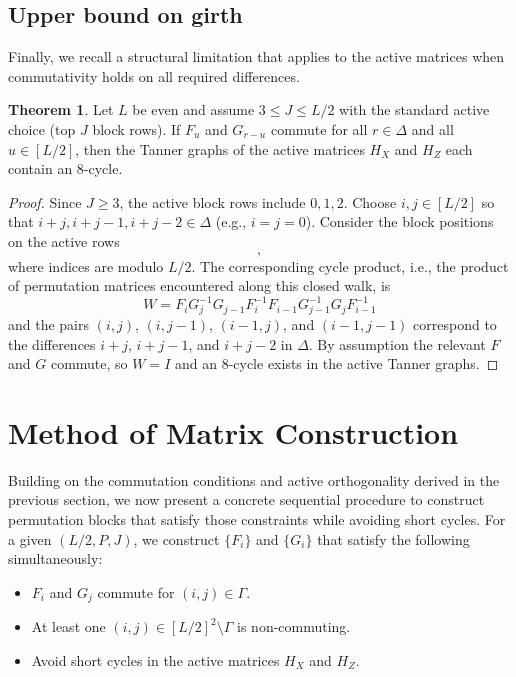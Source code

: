\documentclass[a4paper,onecolumn,11pt,accepted=2026-08-03]{quantumarticle}
\renewcommand\[{\begin{equation}}
\renewcommand\]{\end{equation}}
\theoremstyle{definition}
\newtheorem{theorem}{Theorem}[section]
\begin{document}
\subsection{Upper bound on girth}
Finally, we recall a structural limitation that applies to the active matrices when commutativity holds on all required differences.
\begin{theorem}
Let $L$ be even and assume $3\le J\le L/2$ with the standard active choice (top $J$ block rows). If $F_u$ and $G_{r-u}$ commute for all $r\in\Delta$ and all $u\in[L/2]$, then the Tanner graphs of the active matrices $H_X$ and $H_Z$ each contain an 8-cycle.
\end{theorem}
\begin{proof}
Since $J\ge 3$, the active block rows include $0,1,2$. Choose $i,j\in[L/2]$ so that $i+j,i+j-1,i+j-2\in\Delta$ (e.g., $i=j=0$). Consider the block positions on the active rows
\[
[(0,i),(0,L/2+j),(1,L/2+j),(1,i+1),(2,i+1),(2,L/2+j+1),(1,L/2+j+1),(1,i)],
\]
where indices are modulo $L/2$. The corresponding cycle product, i.e., the product of permutation matrices encountered along this closed walk, is
\[
W=F_iG_j^{-1}G_{j-1}F_i^{-1}F_{i-1}G_{j-1}^{-1}G_jF_{i-1}^{-1}
\label{eq:8cycle-word-general}
\]
and the pairs $(i,j)$, $(i,j-1)$, $(i-1,j)$, and $(i-1,j-1)$ correspond to the differences $i+j$, $i+j-1$, and $i+j-2$ in $\Delta$. By assumption the relevant $F$ and $G$ commute, so $W=I$ and an 8-cycle exists in the active Tanner graphs.
\end{proof}

\section{Method of Matrix Construction}
\label{sec:sequential-apm}
Building on the commutation conditions and active orthogonality derived in the previous section, we now present a concrete sequential procedure to construct permutation blocks that satisfy those constraints while avoiding short cycles.
For a given $(L/2,P,J)$, we construct $\{F_i\}$ and $\{G_i\}$ that satisfy the following simultaneously:
\begin{itemize}
\item[(1)] $F_i$ and $G_j$ commute for $(i,j)\in \Gamma$.
\item[(2)] At least one $(i,j)\in [L/2]^2\setminus \Gamma$ is non-commuting.
\item[(3)] Avoid short cycles in the active matrices $H_X$ and $H_Z$.
\end{itemize}
\end{document}
